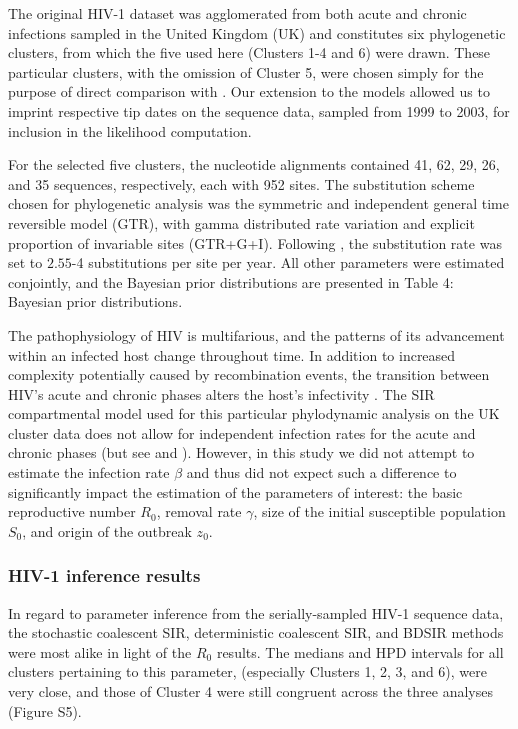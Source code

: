 \documentclass[10pt]{article}
\newcommand{\stochCoalSIR}{stochastic coalescent SIR}
\newcommand{\deterCoalSIR}{deterministic coalescent SIR}
\newcommand{\BDSIR}{BDSIR}
\begin{document}
The original HIV-1 dataset \citep{Hue:2005} was agglomerated from both acute and chronic 
infections sampled in the United Kingdom (UK) and constitutes six phylogenetic clusters, 
from which the five used here (Clusters 1-4 and 6) were drawn.  These particular clusters, with the omission of Cluster 5, were chosen simply 
for the purpose of direct comparison with \cite{Kuhnert:2014}.  Our extension to the 
models allowed us to imprint respective tip dates on the sequence data, sampled from 1999 
to 2003, for inclusion in the likelihood computation. 

For the selected five clusters, the nucleotide alignments 
contained 41, 62, 29, 26, and 35 sequences, respectively, each with 952 sites.  The substitution scheme 
chosen for phylogenetic analysis was the symmetric and independent general time reversible 
model (GTR), with gamma distributed rate variation and explicit proportion of invariable sites (GTR+G+I).  Following \cite{Hue:2005}, the substitution rate 
was set to $\num{2.55}$\mbox{-4} substitutions per site per year.  All other parameters were estimated conjointly, 
and the Bayesian prior distributions are presented in Table 4:  Bayesian prior distributions.

The pathophysiology of HIV is multifarious, and the patterns of its advancement within an 
infected host change throughout time.  In addition to increased complexity potentially caused by recombination events, the transition between HIV's acute and 
chronic phases alters the host's infectivity \citep{Guss:1994}.  The SIR compartmental 
model used for this particular phylodynamic analysis on the UK cluster data does not 
allow for independent infection rates for the acute and chronic phases (but see \cite{VolzFrost:2012} and \cite{Volz:2013}).   However, 
in this study we did not attempt to estimate the infection rate $\beta$ and thus did not 
expect such a difference to significantly impact the estimation of the parameters of 
interest:  the basic reproductive number $R_0$, removal rate $\gamma$, size of the initial susceptible population 
$S_{0}$, and origin of the outbreak $z_{0}$.  


\subsubsection{HIV-1 inference results}  

In regard to parameter inference from the serially-sampled HIV-1 sequence data, the \stochCoalSIR{}, \deterCoalSIR{}, and \BDSIR{} methods were most alike in 
light of the $R_{0}$ results.  The medians and HPD intervals for all clusters pertaining to this parameter,
(especially Clusters 1, 2, 3, and 6), were very close, and those of Cluster 4 were still congruent across the three analyses (Figure S5).  
\end{document}
